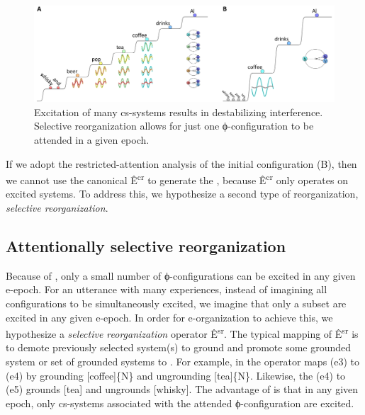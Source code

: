  
\begin{figure}
\includegraphics[width=\textwidth]{figures/Tilsen-img98.png}
\caption{Excitation of many cs-systems results in destabilizing interference. Selective reorganization allows for just one ϕ-con\-fig\-u\-ra\-tion to be attended in a given epoch.}
\label{fig:4:48}
\end{figure}
 

  If we adopt the restricted-attention analysis of the initial configuration (B), then we cannot use the canonical  Ê\textsuperscript{cr} to generate the , because Ê\textsuperscript{cr} only operates on excited systems. To address this, we hypothesize a second type of reorganization, \textit{selective reorganization}.

\subsection{Attentionally selective reorganization}

Because of , only a small number of ϕ-con\-fig\-u\-ra\-tions can be excited in any given e-epoch. For an utterance with many  experiences, instead of imagining all configurations to be simultaneously excited, we imagine that only a subset are excited in any given e-epoch. In order for e-organization to achieve this, we hypothesize a \textit{selective reorganization} operator Ê\textsuperscript{sr}. The typical mapping of  Ê\textsuperscript{sr} is to demote previously selected system(s) to ground and promote some grounded system or set of grounded systems to . For example, in {} the  operator maps (e3) to (e4) by grounding [coffee]\{N\} and ungrounding [tea]\{N\}. Likewise, the  (e4) to (e5) grounds [tea] and ungrounds [whisky]. The advantage of  is that in any given epoch, only cs-systems associated with the attended ϕ-con\-fig\-u\-ra\-tion are excited.

